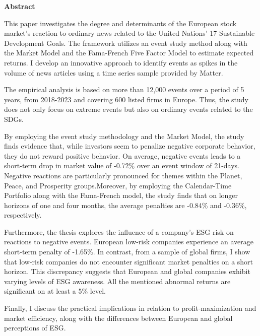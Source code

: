 
\begin{center}
\textbf{Abstract}
\end{center}

This paper investigates the degree and determinants of the European stock market's reaction to ordinary news related to the United Nations' 17 Sustainable Development Goals. The framework utilizes an event study method along with the Market Model and the Fama-French Five Factor Model to estimate expected returns. I develop an innovative approach to identify events as spikes in the volume of news articles using a time series sample provided by Matter. 

The empirical analysis is based on more than 12,000 events over a period of 5 years, from 2018-2023 and covering 600 listed firms in Europe. Thus, the study does not only focus on extreme events but also on ordinary events related to the SDGs.    

By employing the event study methodology and the Market Model, the study finds evidence that, while investors seem to penalize negative corporate behavior, they do not reward positive behavior. On average, negative events leads to a short-term drop in market value of -0.72\% over an event window of 21-days. Negative reactions are particularly pronounced for themes within the Planet, Peace, and Prosperity groups.Moreover, by employing the Calendar-Time Portfolio along with the Fama-French model, the study finds that on longer horizons of one and four months, the average penalties are -0.84\% and -0.36\%, respectively. 

Furthermore, the thesis explores the influence of a company's ESG risk on reactions to negative events. 
European low-risk companies experience an average short-term penalty of -1.65\%. In contrast, from a sample of global firms, I show that low-risk companies do not encounter significant market penalties on a short horizon. This discrepancy suggests that European and global companies exhibit varying levels of ESG awareness. All the mentioned abnormal returns are significant on at least a 5\% level. 

Finally, I discuss the practical implications in relation to profit-maximization and market efficiency, along with the differences between European and global perceptions of ESG. 
